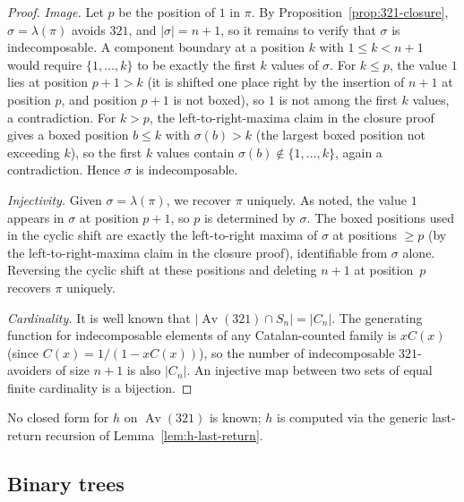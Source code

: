 \documentclass[a4paper,11pt]{article}
\theoremstyle{definition}
\DeclareMathOperator{\Av}{Av}
\begin{document}
\begin{proof}
\emph{Image.} Let $p$ be the position of $1$ in $\pi$. By
Proposition~\ref{prop:321-closure}, $\sigma = \lambda(\pi)$
avoids $321$, and $|\sigma| = n{+}1$, so it remains to verify
that $\sigma$ is indecomposable. A component boundary at a
position $k$ with $1 \leq k < n{+}1$ would require
$\{1, \ldots, k\}$ to be exactly the first $k$ values of
$\sigma$. For $k \leq p$, the value $1$ lies at position
$p{+}1 > k$ (it is shifted one place right by the insertion of
$n{+}1$ at position $p$, and position $p{+}1$ is not boxed), so
$1$ is not among the first $k$ values, a contradiction. For
$k > p$, the left-to-right-maxima claim in the closure proof
gives a boxed position $b \leq k$ with $\sigma(b) > k$ (the
largest boxed position not exceeding $k$), so the first $k$
values contain $\sigma(b) \notin \{1, \ldots, k\}$, again a
contradiction. Hence $\sigma$ is indecomposable.

\emph{Injectivity.} Given $\sigma = \lambda(\pi)$, we
recover $\pi$ uniquely. As noted, the value $1$ appears in
$\sigma$ at position $p{+}1$, so $p$ is determined by $\sigma$. The boxed
positions used in the cyclic shift are exactly the
left-to-right maxima of $\sigma$ at positions $\geq p$
(by the left-to-right-maxima claim in the closure
proof), identifiable
from $\sigma$ alone. Reversing the cyclic shift at
these positions and deleting $n{+}1$ at position~$p$
recovers $\pi$ uniquely.

\emph{Cardinality.}
It is well known that $|\Av(321) \cap S_n| = |C_n|$.
The
generating function for indecomposable elements of
any Catalan-counted family is $xC(x)$ (since
$C(x) = 1/(1-xC(x))$), so the number of
indecomposable $321$-avoiders of size $n{+}1$ is also
$|C_n|$. An injective map between two sets of equal
finite cardinality is a bijection.
\end{proof}

No closed form for $h$ on $\Av(321)$ is known; $h$ is
computed via the generic last-return recursion of
Lemma~\ref{lem:h-last-return}.

\subsection{Binary trees}\label{sec:binary}
\end{document}
